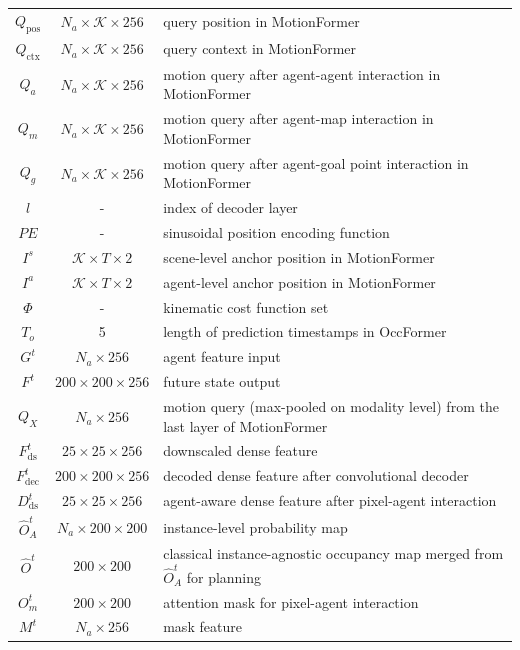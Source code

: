 \documentclass[10pt,twocolumn,letterpaper]{article}
\begin{document}
\begin{table}
\begin{center}
\begin{tabular}{ccl}
				$Q_{\text{pos}}$ & $N_{a} \times \mathcal{K} \times 256$ & query position in MotionFormer \\
				$Q_{\text{ctx}}$ & $N_{a} \times \mathcal{K} \times 256$ &query context in MotionFormer \\
				$Q_{a}$ & $N_{a} \times \mathcal{K} \times 256$ &motion query after agent-agent interaction in MotionFormer \\
				$Q_{m}$ & $N_{a} \times \mathcal{K} \times 256$ &motion query after agent-map interaction in MotionFormer \\
				$Q_{g}$ & $N_{a} \times \mathcal{K} \times 256$ &motion query after agent-goal point interaction in MotionFormer \\
				$l$ & - &index of decoder layer \\
				$PE$ & - &sinusoidal position encoding function \\
				$I^s$ & $\mathcal{K} \times T \times 2 $ &scene-level anchor position in MotionFormer \\
				$I^a$ & $\mathcal{K} \times T \times 2 $ &agent-level anchor position in MotionFormer\\
				$\Phi$ & - &kinematic cost function set \\
				$T_o$ & 5 &length of prediction timestamps in OccFormer \\
				$G^t$ & $N_a \times 256$ & agent feature input\\
				$F^t$ &  $200 \times 200 \times 256$ & future state output \\
				$Q_X$ & $N_a \times 256$ & motion query (max-pooled on modality level) from the last layer of MotionFormer \\
				$F_{\text{ds}}^t$ & $25\times 25 \times 256$ & downscaled dense feature\\
				$F_{\text{dec}}^t$ & $200\times 200 \times 256$ &decoded dense feature after convolutional decoder\\
				$D_{\text{ds}}^t$ & $25\times 25 \times 256$ &agent-aware dense feature after pixel-agent interaction\\
				$\hat{O}_A^t$ &$N_{a} \times 200\times 200$ &instance-level probability map\\
				$\hat{O}^t$ &$200\times 200$&classical instance-agnostic occupancy map merged from $\hat{O}_A^t$ for planning\\
				$O_m^t$ & $200\times 200$ &attention mask for pixel-agent interaction\\
				$M^t$ & $N_{a} \times 256$ &mask feature\\

\end{tabular}
\end{center}
\end{table}
\end{document}
